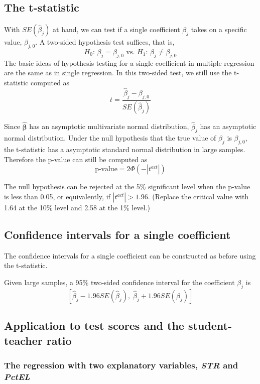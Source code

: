 \documentclass[a4paper,11pt]{article}
\begin{document}
\subsection{The t-statistic}
\label{sec:org2dd2d90}

With \(SE(\hat{\beta}_j)\) at hand, we can test if a single coefficient
\(\beta_j\) takes on a specific value, \(\beta_{j,0}\). A two-sided
hypothesis test suffices, that is,
\[ H_0:\, \beta_j = \beta_{j,0} \text{ vs. } H_1:\, \beta_j \neq
\beta_{j,0} \]
The basic ideas of hypothesis testing for a single coefficient in
multiple regression are the same as in single regression.  In this
two-sided test, we still use the t-statistic computed as
\[ t = \frac{\hat{\beta}_j - \beta_{j,0}}{SE(\hat{\beta}_j)} \]

Since \(\boldsymbol{\hat{\beta}}\) has an asymptotic multivariate normal
distribution, \(\hat{\beta}_j\) has an asymptotic normal
distribution. Under the null hypothesis that the true value of
\(\beta_j\) is \(\beta_{j,0}\), the t-statistic has a asymptotic standard
normal distribution in large samples. Therefore the p-value can still
be computed as
\[ \text{p-value} = 2\varPhi(-|t^{act}|) \]

The null hypothesis can be rejected at the 5\% significant level when
the p-value is less than 0.05, or equivalently, if \(|t^{act}| >
1.96\). (Replace the critical value with 1.64 at the 10\% level and 2.58
at the 1\% level.)


\subsection{Confidence intervals for a single coefficient}
\label{sec:orge1b38a6}

The confidence intervals for a single coefficient can be constructed
as before using the t-statistic.

Given large samples, a 95\% two-sided confidence interval for the
coefficient \(\beta_j\) is
\[ \left[\hat{\beta}_j - 1.96 SE(\hat{\beta}_j),\; \hat{\beta}_j +
1.96 SE(\hat{\beta}_j)\right] \]


\subsection{Application to test scores and the student-teacher ratio}
\label{sec:orgb7a60bf}

\subsubsection*{The regression with two explanatory variables, \emph{STR} and \emph{PctEL}}
\label{sec:org6cb5458}
\end{document}
